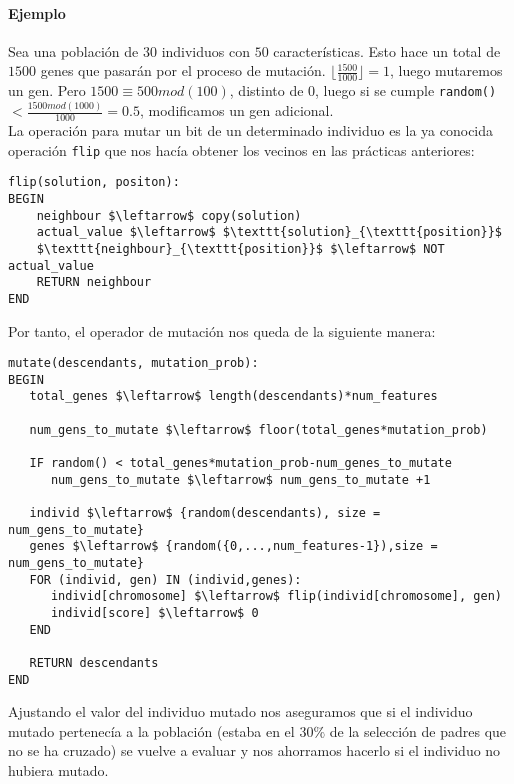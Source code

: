 \documentclass[11pt,leqno]{article}
\begin{document}
	\paragraph{Ejemplo} Sea una población de $30$ individuos con $50$ características. Esto hace un total de $1500$ genes que pasarán por el proceso de mutación. $\lfloor \frac{1500}{1000} \rfloor = 1$, luego mutaremos un gen. Pero $1500 \equiv 500 mod(100)$, distinto de $0$, luego si se cumple \texttt{random()} $ < \frac{1500 mod(1000)}{1000} = 0.5$, modificamos un gen adicional.\\
	La operación para mutar un bit de un determinado individuo es la ya conocida operación \texttt{flip} que nos hacía obtener los vecinos en las prácticas anteriores:
	
\begin{lstlisting}[mathescape=true]
flip(solution, positon):
BEGIN
	neighbour $\leftarrow$ copy(solution)
	actual_value $\leftarrow$ $\texttt{solution}_{\texttt{position}}$
	$\texttt{neighbour}_{\texttt{position}}$ $\leftarrow$ NOT actual_value
	RETURN neighbour
END
\end{lstlisting}

	Por tanto, el operador de mutación nos queda de la siguiente manera: 
	
\begin{lstlisting}[mathescape=true]
mutate(descendants, mutation_prob):
BEGIN
   total_genes $\leftarrow$ length(descendants)*num_features
                                 
   num_gens_to_mutate $\leftarrow$ floor(total_genes*mutation_prob)
    
   IF random() < total_genes*mutation_prob-num_genes_to_mutate
      num_gens_to_mutate $\leftarrow$ num_gens_to_mutate +1
    
   individ $\leftarrow$ {random(descendants), size = num_gens_to_mutate}
   genes $\leftarrow$ {random({0,...,num_features-1}),size = num_gens_to_mutate}
   FOR (individ, gen) IN (individ,genes):
      individ[chromosome] $\leftarrow$ flip(individ[chromosome], gen)
      individ[score] $\leftarrow$ 0
   END
   
   RETURN descendants
END
\end{lstlisting}

	Ajustando el valor del individuo mutado nos aseguramos que si el individuo mutado pertenecía a la población (estaba en el $30\%$ de la selección de padres que no se ha cruzado) se vuelve a evaluar y nos ahorramos hacerlo si el individuo no hubiera mutado.
\end{document}
